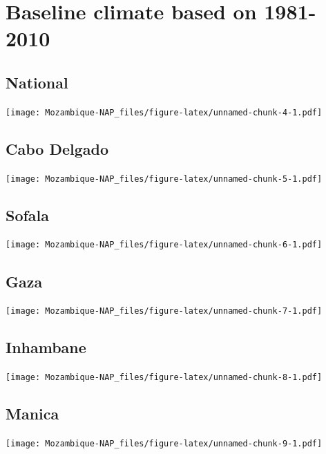 \documentclass[
]{book}
\begin{document}
\hypertarget{baseline-climate-based-on-1981-2010}{%
\section{Baseline climate based on 1981-2010}\label{baseline-climate-based-on-1981-2010}}

\hypertarget{national}{%
\subsection{National}\label{national}}

\texttt{[image: Mozambique-NAP\_files/figure-latex/unnamed-chunk-4-1.pdf]}

\hypertarget{cabo-delgado}{%
\subsection{Cabo Delgado}\label{cabo-delgado}}

\texttt{[image: Mozambique-NAP\_files/figure-latex/unnamed-chunk-5-1.pdf]}

\hypertarget{sofala}{%
\subsection{Sofala}\label{sofala}}

\texttt{[image: Mozambique-NAP\_files/figure-latex/unnamed-chunk-6-1.pdf]}

\hypertarget{gaza}{%
\subsection{Gaza}\label{gaza}}

\texttt{[image: Mozambique-NAP\_files/figure-latex/unnamed-chunk-7-1.pdf]}

\hypertarget{inhambane}{%
\subsection{Inhambane}\label{inhambane}}

\texttt{[image: Mozambique-NAP\_files/figure-latex/unnamed-chunk-8-1.pdf]}

\hypertarget{manica}{%
\subsection{Manica}\label{manica}}

\texttt{[image: Mozambique-NAP\_files/figure-latex/unnamed-chunk-9-1.pdf]}
\end{document}
